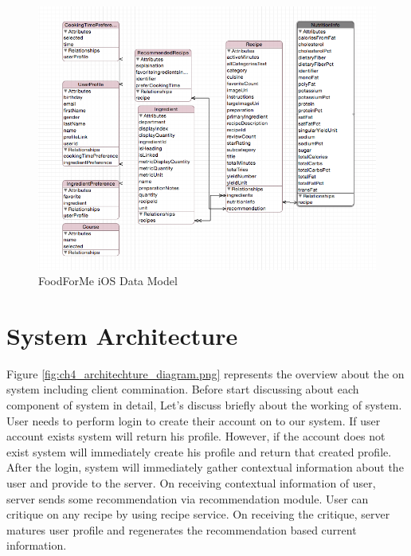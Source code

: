 	   \begin{figure}[h]
	   	\centering
	   	\includegraphics[width=1\linewidth]{figures/ch4_ios_data_model}
	   	\caption{FoodForMe iOS Data Model}
	   	\label{fig:foodforme_ios_data_model}
	   \end{figure}
	   

\section{System Architecture}

Figure \ref{fig:ch4_architechture_diagram.png} represents the overview about the  on system including client commination.  Before start discussing about each component of system in detail, Let’s discuss briefly about the working of system. User needs to perform login to create their account on to our system. If user account exists system will return his profile. However, if the account does not exist system will immediately create his profile and return that created profile. After the login, system will immediately gather contextual information about the user and provide to the server. On receiving contextual information of user, server sends some recommendation via recommendation module. User can critique on any recipe by using recipe service. On receiving the critique, server matures user profile and regenerates the recommendation based current information.
\newline  

